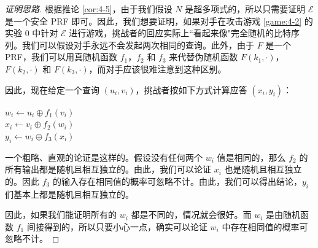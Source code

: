 \begin{proof}[证明思路]
根据推论 \ref{cor:4-5}，由于我们假设 $N$ 是超多项式的，所以只需要证明 $\mathcal{E}$ 是一个安全 PRF 即可。因此，我们想要证明，如果对手在攻击游戏 \ref{game:4-2} 的实验 $0$ 中针对 $\mathcal{E}$ 进行游戏，挑战者的回应实际上``看起来像"完全随机的比特序列。我们可以假设对手永远不会发起两次相同的查询。此外，由于 $F$ 是一个 PRF，我们可以用真随机函数 $f_1$，$f_2$ 和 $f_3$ 来代替伪随机函数 $F(k_1,\cdot)$，$F(k_2,\cdot)$ 和 $F(k_3,\cdot)$，而对手应该很难注意到这种区别。

因此，现在给定一个查询 $(u_i,v_i)$，挑战者按如下方式计算应答 $(x_i,y_i)$：

\vspace{5pt}

\hspace*{5pt} $w_i\leftarrow u_i\oplus f_1(v_i)$\\
\hspace*{26pt} $x_i\leftarrow v_i\oplus f_2(w_i)$\\
\hspace*{26pt} $y_i\leftarrow w_i\oplus f_3(x_i)$

\vspace{5pt}

一个粗略、直观的论证是这样的。假设没有任何两个 $w_i$ 值是相同的，那么 $f_2$ 的所有输出都是随机且相互独立的。由此，我们可以论证 $x_i$ 也是随机且相互独立的。因此 $f_3$ 的输入存在相同值的概率可忽略不计。由此，我们可以得出结论，$y_i$ 们基本上都是随机且相互独立的。

因此，如果我们能证明所有的 $w_i$ 都是不同的，情况就会很好。而 $w_i$ 是由随机函数 $f_1$ 间接得到的，所以只要小心一点，确实可以论证 $w_i$ 中存在相同值的概率可忽略不计。
\end{proof}

